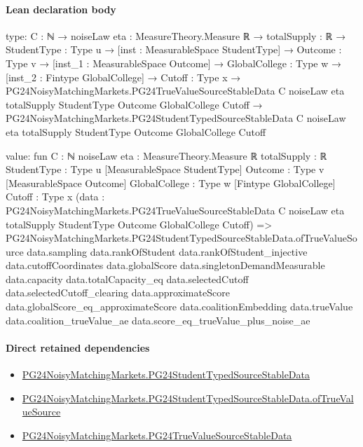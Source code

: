 \documentclass[10pt]{article}
\begin{document}
\paragraph{Lean declaration body}
\begin{ReviewVerbatim}
type:
{C : ℕ} →
  {noiseLaw eta : MeasureTheory.Measure ℝ} →
    {totalSupply : ℝ} →
      {StudentType : Type u} →
        [inst : MeasurableSpace StudentType] →
          {Outcome : Type v} →
            [inst_1 : MeasurableSpace Outcome] →
              {GlobalCollege : Type w} →
                [inst_2 : Fintype GlobalCollege] →
                  {Cutoff : Type x} →
                    PG24NoisyMatchingMarkets.PG24TrueValueSourceStableData C noiseLaw eta totalSupply StudentType
                        Outcome GlobalCollege Cutoff →
                      PG24NoisyMatchingMarkets.PG24StudentTypedSourceStableData C noiseLaw eta totalSupply StudentType
                        Outcome GlobalCollege Cutoff

value:
fun {C : ℕ} {noiseLaw eta : MeasureTheory.Measure ℝ} {totalSupply : ℝ} {StudentType : Type u}
    [MeasurableSpace StudentType] {Outcome : Type v} [MeasurableSpace Outcome] {GlobalCollege : Type w}
    [Fintype GlobalCollege] {Cutoff : Type x}
    (data :
      PG24NoisyMatchingMarkets.PG24TrueValueSourceStableData C noiseLaw eta totalSupply StudentType Outcome
        GlobalCollege Cutoff) =>
  PG24NoisyMatchingMarkets.PG24StudentTypedSourceStableData.ofTrueValueSource data.sampling data.rankOfStudent
    data.rankOfStudent_injective data.cutoffCoordinates data.globalScore data.singletonDemandMeasurable data.capacity
    data.totalCapacity_eq data.selectedCutoff data.selectedCutoff_clearing data.approximateScore
    data.globalScore_eq_approximateScore data.coalitionEmbedding data.trueValue data.coalition_trueValue_ae
    data.score_eq_trueValue_plus_noise_ae
\end{ReviewVerbatim}

\paragraph{Direct retained dependencies}
\begin{itemize}\raggedright
\item \hyperlink{governing-declaration-f4c2fb7f4f9fc54d}{PG24\allowbreak{}Noisy\allowbreak{}Matching\allowbreak{}Markets.\allowbreak{}PG24\allowbreak{}Student\allowbreak{}Typed\allowbreak{}Source\allowbreak{}Stable\allowbreak{}Data}
\item \hyperlink{governing-declaration-1bd4445166d1dc9f}{PG24\allowbreak{}Noisy\allowbreak{}Matching\allowbreak{}Markets.\allowbreak{}PG24\allowbreak{}Student\allowbreak{}Typed\allowbreak{}Source\allowbreak{}Stable\allowbreak{}Data.\allowbreak{}of\allowbreak{}True\allowbreak{}Value\allowbreak{}Source}
\item \hyperlink{governing-declaration-85595fc482827ece}{PG24\allowbreak{}Noisy\allowbreak{}Matching\allowbreak{}Markets.\allowbreak{}PG24\allowbreak{}True\allowbreak{}Value\allowbreak{}Source\allowbreak{}Stable\allowbreak{}Data}
\end{itemize}
\hypertarget{governing-declaration-0d9884db4fa22710}{}
\end{document}

